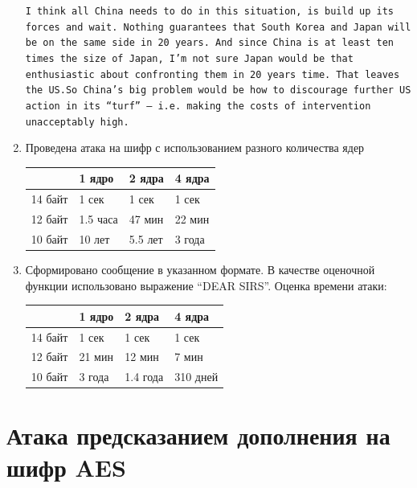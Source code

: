 \documentclass[a4paper, 14pt]{extarticle}
\begin{document}
\begin{enumerate}
        \texttt{I think all China needs to do in this situation, is build up its forces and wait. Nothing guarantees that South Korea and Japan will be on the same side in 20 years. And since China is at least ten times the size of Japan, I'm not sure Japan would be that enthusiastic about confronting them in 20 years time. That leaves the US.\@ So China's big problem would be how to discourage further US action in its ``turf'' --- i.e.\ making the costs of intervention unacceptably high.}
    \item Проведена атака на шифр с использованием разного количества ядер
        \begin{table}[h]
            \centering
            \begin{tabular}{@{}llll@{}}
                \toprule
 & \textbf{1 ядро} & \textbf{2 ядра} & \textbf{4 ядра} \\ \midrule
                14 байт & 1 сек & 1 сек & 1 сек \\
                12 байт & 1.5 часа & 47 мин & 22 мин \\
                10 байт & 10 лет & 5.5 лет & 3 года \\ \bottomrule
            \end{tabular}
        \end{table}
    \item Сформировано сообщение в указанном формате. В качестве оценочной функции использовано выражение \enquote{DEAR SIRS}. Оценка времени атаки:
        \begin{table}[h]
            \centering
            \begin{tabular}{@{}llll@{}}
                \toprule
 & \textbf{1 ядро} & \textbf{2 ядра} & \textbf{4 ядра} \\ \midrule
                14 байт & 1 сек & 1 сек & 1 сек \\
                12 байт & 21 мин & 12 мин & 7 мин \\
                10 байт & 3 года & 1.4 года & 310 дней \\ \bottomrule
            \end{tabular}
        \end{table}

\end{enumerate}

\section{Атака предсказанием дополнения на шифр AES}
\end{document}
